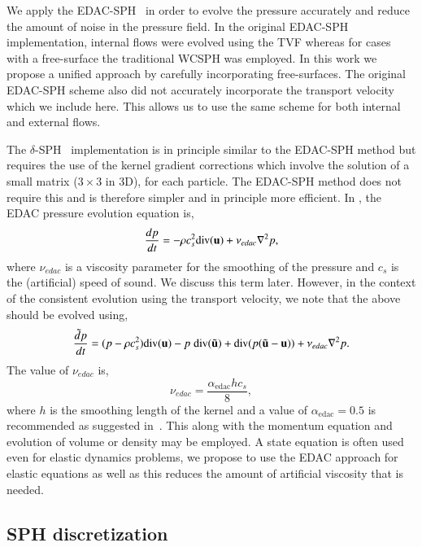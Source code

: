 We apply the EDAC-SPH~\citep{edac-sph:cf:2019} in order to evolve the pressure
accurately and reduce the amount of noise in the pressure field. In the
original EDAC-SPH implementation, internal flows were evolved using the TVF
whereas for cases with a free-surface the traditional WCSPH was employed. In
this work we propose a unified approach by carefully incorporating
free-surfaces. The original EDAC-SPH scheme also did not accurately
incorporate the transport velocity which we include here. This allows us to
use the same scheme for both internal and external flows.

The $\delta$-SPH~\citep{antuono-deltasph:cpc:2010} implementation is in
principle similar to the EDAC-SPH method but requires the use of the kernel
gradient corrections which involve the solution of a small matrix ($3 \times
3$ in 3D), for each particle. The EDAC-SPH method does not require this and is
therefore simpler and in principle more efficient. In \citep{edac-sph:cf:2019},
the EDAC pressure evolution equation is,
\begin{equation}
  \label{eq:edac-p-evolve-orig}
     \frac{d p}{d t} = -\rho c_s^2 \text{div}(\mathbf{u}) + \nu_{edac}  \nabla^2 p,
\end{equation}
where $\nu_{edac}$ is a viscosity parameter for the smoothing of the pressure
and $c_s$ is the (artificial) speed of sound. We discuss this term later.
However, in the context of the consistent evolution using the transport
velocity, we note that the above should be evolved using,
\begin{equation}
  \label{eq:edac-p-evolve}
  \frac{\tilde{d} p}{d t} =
  (p -\rho c_s^2)
    \text{div}(\mathbf{u})
  - p \; \text{div}(\tilde{\mathbf{u}})
    + \text{div}(p (\tilde{\mathbf{u}} - \mathbf{u}))
    + \nu_{edac}  \nabla^2 p.
\end{equation}
%
The value of $\nu_{edac}$ is,
\begin{equation}
  \label{eq:nu-edac}
  \nu_{edac} = \frac{\alpha_{\textrm{edac}} h c_s}{8},
\end{equation}
where $h$ is the smoothing length of the kernel and a value of
$\alpha_{\textrm{edac}}=0.5$ is recommended as suggested in~\citep{PRKP:edac-sph-iccm2015}.
This along with the momentum equation and evolution of volume or density may
be employed. A state equation is often used even for elastic dynamics
problems, we propose to use the EDAC approach for elastic equations as well as
this reduces the amount of artificial viscosity that is needed.


\subsection{SPH discretization}\label{sec:ctvf-sph-equations}

